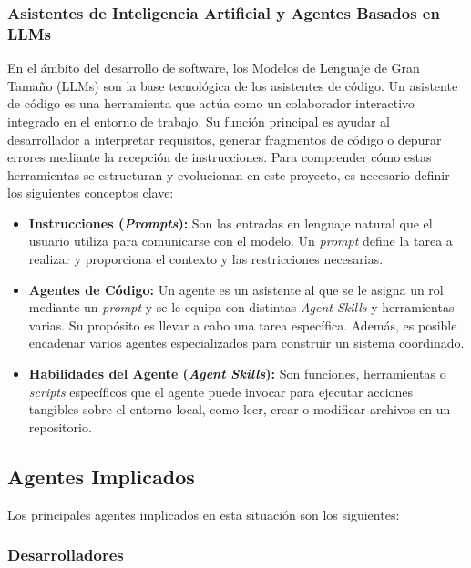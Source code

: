 \documentclass[11pt, letterpaper]{article}
\begin{document}
\subsubsection{Asistentes de Inteligencia Artificial y Agentes Basados en LLMs}

En el ámbito del desarrollo de software, los Modelos de Lenguaje de Gran Tamaño (LLMs) son la base tecnológica de los asistentes de código. Un asistente de código es una herramienta que actúa como un colaborador interactivo integrado en el entorno de trabajo. Su función principal es ayudar al desarrollador a interpretar requisitos, generar fragmentos de código o depurar errores mediante la recepción de instrucciones. Para comprender cómo estas herramientas se estructuran y evolucionan en este proyecto, es necesario definir los siguientes conceptos clave:

\begin{itemize}
    \item \textbf{Instrucciones (\textit{Prompts}):} Son las entradas en lenguaje natural que el usuario utiliza para comunicarse con el modelo. Un \textit{prompt} define la tarea a realizar y proporciona el contexto y las restricciones necesarias.
    
    \item \textbf{Agentes de Código:} Un agente es un asistente al que se le asigna un rol mediante un \textit{prompt} y se le equipa con distintas \textit{Agent Skills} y herramientas varias. Su propósito es llevar a cabo una tarea específica. Además, es posible encadenar varios agentes especializados para construir un sistema coordinado. \cite{vscode_agents} \cite{wang_llm_agents_2024}

    \item \textbf{Habilidades del Agente (\textit{Agent Skills}):} Son funciones, herramientas o \textit{scripts} específicos que el agente puede invocar para ejecutar acciones tangibles sobre el entorno local, como leer, crear o modificar archivos en un repositorio. \cite{agentskills_home} \cite{yao_react_2023}
\end{itemize}

\subsection{Agentes Implicados}

Los principales agentes implicados en esta situación son los siguientes:

\subsubsection{Desarrolladores}
\end{document}
